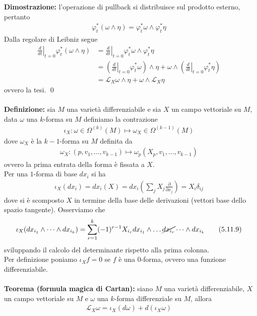 \documentclass{article}
\begin{document}
\textbf{Dimostrazione:} l'operazione di pullback si distribuisce sul prodotto esterno, pertanto
\begin{align*}
    \varphi^*_t(\omega \wedge \eta) = \varphi^*_t\omega \wedge \varphi^*_t\eta \tag{5.11.4}
\end{align*}
Dalla regolare di Leibniz segue
\begin{align*}
    \left.\frac{d}{dt}\right|_{t = 0}\varphi^*_t(\omega \wedge \eta) &= \left.\frac{d}{dt}\right|_{t = 0}\varphi^*_t\omega \wedge \varphi^*_t\eta \\
    &= \left(\left.\frac{d}{dt}\right|_{t = 0}\varphi^*_t\omega\right) \wedge \eta + \omega \wedge \left(\left.\frac{d}{dt}\right|_{t = 0} \varphi^*_t\eta\right) \\
    &= \mathcal{L}_X\omega \wedge \eta + \omega \wedge \mathcal{L}_X \eta \tag{5.11.5}
\end{align*}
ovvero la tesi. \qed \\ \\
\textbf{Definizione:} sia $M$ una varietà differenziabile e sia $X$ un campo vettoriale su $M$, data $\omega$ una $k$-forma su $M$ definiamo la contrazione
\begin{align*}
    \iota_X : \omega \in \Omega^{(k)}(M) \mapsto \omega_X \in \Omega^{(k - 1)}(M) \tag{5.11.6}
\end{align*}
dove $\omega_X$ è la $k - 1$-forma su $M$ definita da
\begin{align*}
    \omega_X : (p, v_1, \dots, v_{k - 1}) \mapsto \omega_p(X_p, v_1, \dots, v_{k - 1}) \tag{5.11.7}
\end{align*}
ovvero la prima entrata della forma è fissata a $X$. \\
Per una $1$-forma di base $dx_i$ si ha
\begin{align*}
    \iota_X(dx_i) = dx_i(X) = dx_i\left(\sum_j X_j\frac{\partial}{\partial x_j}\right) = X_i\delta_{ij} \tag{5.11.8}
\end{align*}
dove si è scomposto $X$ in termine della base delle derivazioni (vettori base dello spazio tangente). Osserviamo che
\begin{align*}
    \iota_X(dx_{i_1} \wedge \dots \wedge dx_{i_k}) = \sum_{r = 1}^k (-1)^{r - 1}X_{i_r}dx_{i_1} \wedge \dots \cancel{dx_{i_r}} \dots \wedge dx_{i_k} \tag{5.11.9}
\end{align*}
sviluppando il calcolo del determinante rispetto alla prima colonna. \\
Per definizione poniamo $\iota_X f = 0$ se $f$ è una $0$-forma, ovvero una funzione differenziabile. \\ \\
\textbf{Teorema (formula magica di Cartan):} siano $M$ una varietà differenziabile, $X$ un campo vettoriale su $M$ e $\omega$ una $k$-forma differenziale su $M$, allora
\begin{align*}
    \mathcal{L}_X\omega = \iota_X(d\omega) + d(\iota_X \omega) \tag{5.11.10}
\end{align*} \\
\end{document}
